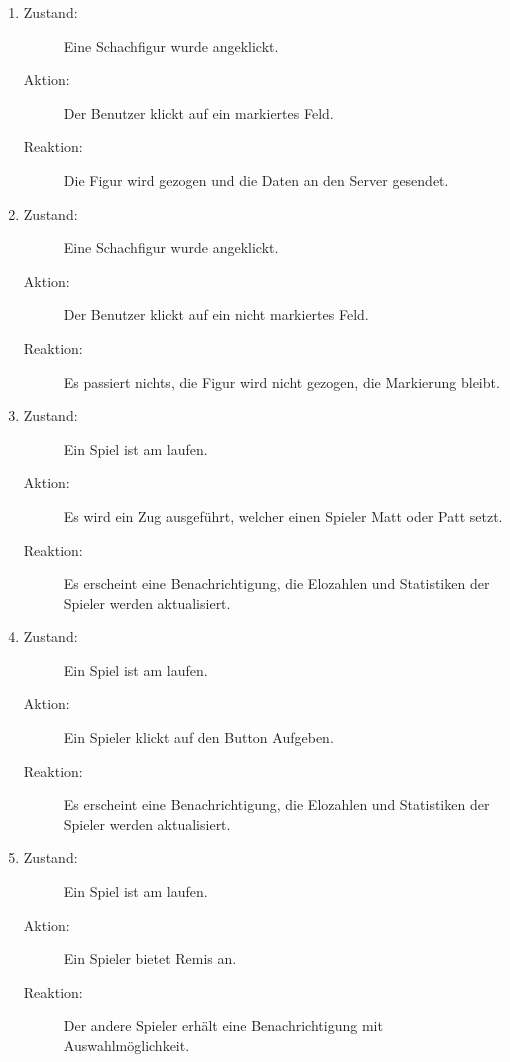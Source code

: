 \documentclass[parskip=full]{scrartcl}
\begin{document}
\begin{enumerate}
	
	\item
	\begin{description}
	\item[Zustand:] Eine \gls{Schachfigur} wurde angeklickt.
	\item[Aktion:] Der Benutzer klickt auf ein markiertes Feld.
	\item[Reaktion:] Die Figur wird gezogen und die Daten an den Server gesendet.  \\
	\end{description}
	
	\item
	\begin{description}
	\item[Zustand:] Eine \gls{Schachfigur} wurde angeklickt.
	\item[Aktion:] Der Benutzer klickt auf ein nicht markiertes Feld.
	\item[Reaktion:] Es passiert nichts, die Figur wird nicht gezogen, die Markierung bleibt.  \\
	\end{description}
	
	\item
	\begin{description}
	\item[Zustand:] Ein Spiel ist am laufen.
	\item[Aktion:] Es wird ein Zug ausgeführt, welcher einen Spieler Matt oder Patt setzt.
	\item[Reaktion:] Es erscheint eine Benachrichtigung, die Elozahlen und Statistiken der Spieler werden aktualisiert.  \\
	\end{description}
	
	\item
	\begin{description}
	\item[Zustand:] Ein Spiel ist am laufen.
	\item[Aktion:] Ein Spieler klickt auf den Button \glqq Aufgeben\grqq.
	\item[Reaktion:] Es erscheint eine Benachrichtigung, die Elozahlen und Statistiken der Spieler werden aktualisiert.  \\
	\end{description}
	
	\item
	\begin{description}
	\item[Zustand:] Ein Spiel ist am laufen.
	\item[Aktion:] Ein Spieler bietet Remis an.
	\item[Reaktion:] Der andere Spieler erhält eine Benachrichtigung mit Auswahlmöglichkeit.  \\
	\end{description}
	

\end{enumerate}
\end{document}
